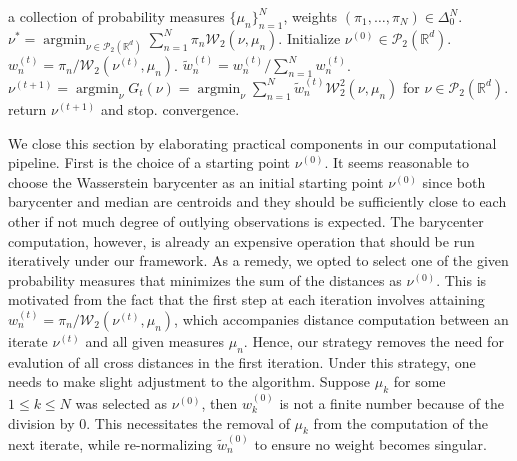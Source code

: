 \documentclass[11pt]{article}
\DeclareMathOperator*{\argmin}{argmin}
\newcommand{\calP}{\mathcal{P}}
\newcommand{\calW}{\mathcal{W}}
\newcommand{\bbR}{\mathbb{R}}
\begin{document}
\begin{algorithm}[t]
	\caption{Wasserstein median computation by IRLS.}
	\label{code:general_irls}
	\begin{algorithmic}
		\REQUIRE a collection of probability measures $\lbrace \mu_n \rbrace_{n=1}^N$, weights $(\pi_1,\ldots,\pi_N)\in\Delta_0^N$.
		\ENSURE $\nu^* = \argmin_{\nu \in \calP_2 (\bbR^d)} \sum_{n=1}^N \pi_n \calW_2 (\nu, \mu_n)$.
		\STATE Initialize $\nu^{(0)} \in \calP_2 (\bbR^d)$.
		\REPEAT 
		\STATE $w_n^{(t)} = \pi_n / \calW_2 (\nu^{(t)}, \mu_n)$.
		\STATE $\tilde{w}_n^{(t)} = w_n^{(t)}/\sum_{n=1}^N w_n^{(t)}$.
		\STATE $\nu^{(t+1)} = \argmin_\nu G_t (\nu) = \argmin_\nu \sum_{n=1}^N \tilde{w}_n^{(t)} \calW_2^2 (\nu, \mu_n)$ for $\nu \in \calP_2 (\bbR^d)$.
		\STATE return $\nu^{(t+1)}$ and stop.
		\ENDIF 
		\UNTIL convergence.
	\end{algorithmic}
\end{algorithm}


We close this section by elaborating practical components in our computational pipeline. First is the choice of a starting point $\nu^{(0)}$. It seems reasonable to choose the Wasserstein barycenter as an initial starting point $\nu^{(0)}$ since both barycenter and median are centroids and they should be sufficiently close to each other if not much degree of outlying observations is expected. The barycenter computation, however, is already an expensive operation that should be run iteratively under our framework. As a remedy, we opted to select  one of the given probability measures that minimizes the sum of the distances as $\nu^{(0)}$. This is motivated from the fact that the first step at each iteration  involves attaining $w_n^{(t)} = \pi_n / \calW_2 (\nu^{(t)}, \mu_n)$, which accompanies distance computation between an iterate $\nu^{(t)}$ and all given measures $\mu_n$. Hence, our strategy removes the need for evalution of all cross distances in the first iteration. Under this strategy, one needs to make slight adjustment to the algorithm. Suppose $\mu_k$ for some $1\leq k\leq N$ was selected as $\nu^{(0)}$, then $w_k^{(0)}$ is not a finite number because of the division by 0. This necessitates the removal of $\mu_k$ from the computation of the next iterate, while re-normalizing $\tilde{w}_n^{(0)}$ to ensure no weight becomes singular.
\end{document}
